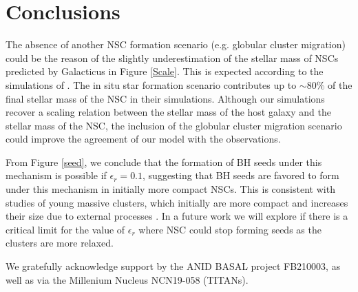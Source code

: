 \documentclass[baaa]{baaa}
\begin{document}
\section{Conclusions}

The absence of another NSC formation scenario (e.g. globular cluster migration) could be the reason of the slightly underestimation of the stellar mass of NSCs predicted by {\sc Galacticus} in Figure \ref{Scale}. This is expected according to the simulations of \cite{ANTONINI2015}. The in situ star formation scenario contributes up to $\sim80\%$ of the final stellar mass of the NSC in their simulations.  Although our simulations recover a scaling relation between the stellar mass of the host galaxy and the stellar mass of the NSC, the inclusion of the globular cluster migration scenario \citep{ANTONINI2015} could improve the agreement of our model with the observations.

From Figure \ref{seed}, we conclude that the formation of BH seeds under this mechanism is possible if $\epsilon_r=0.1$, suggesting that BH seeds are favored to form under this mechanism in initially more compact NSCs. This is consistent with studies of young massive clusters, which initially are more compact and increases their size due to external processes \citep{KROUPA2017}. In a future work we will explore if there is a critical limit for the value of $\epsilon_r$ where NSC could stop forming seeds as the clusters are more relaxed. 

\begin{acknowledgement}
We gratefully acknowledge support by the ANID BASAL project FB210003, as well as via the Millenium Nucleus NCN19-058 (TITANs).
\end{acknowledgement}





\small


\end{document}
